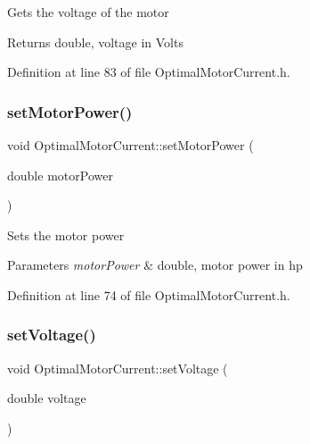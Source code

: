 Gets the voltage of the motor

\begin{DoxyReturn}{Returns}
double, voltage in Volts 
\end{DoxyReturn}


Definition at line 83 of file Optimal\+Motor\+Current.\+h.

\mbox{\label{class_optimal_motor_current_a4950fe2e789f5c150648a846898aff74}} 
\subsubsection{\texorpdfstring{set\+Motor\+Power()}{setMotorPower()}}
{\footnotesize\ttfamily void Optimal\+Motor\+Current\+::set\+Motor\+Power (\begin{DoxyParamCaption}\item[{double}]{motor\+Power }\end{DoxyParamCaption})\hspace{0.3cm}{\ttfamily [inline]}}

Sets the motor power


\begin{DoxyParams}{Parameters}
{\em motor\+Power} & double, motor power in hp \\
\hline
\end{DoxyParams}


Definition at line 74 of file Optimal\+Motor\+Current.\+h.

\mbox{\label{class_optimal_motor_current_a71dd261541b67b551e7053d3d6a35f6d}} 
\subsubsection{\texorpdfstring{set\+Voltage()}{setVoltage()}}
{\footnotesize\ttfamily void Optimal\+Motor\+Current\+::set\+Voltage (\begin{DoxyParamCaption}\item[{double}]{voltage }\end{DoxyParamCaption})\hspace{0.3cm}{\ttfamily [inline]}}

